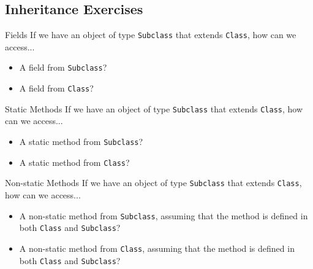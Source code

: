 \documentclass[9pt]{beamer}
\begin{document}
\subsection{Inheritance Exercises}
\begin{frame}{Fields}
  If we have an object of type {\tt Subclass} that extends {\tt Class}, how can
  we access...
  \begin{itemize}
    \item
      A field from {\tt Subclass}? \\
    \item
      A field from {\tt Class}? \\
\end{itemize}
\end{frame}

\begin{frame}{Static Methods}
  If we have an object of type {\tt Subclass} that extends {\tt Class}, how can
  we access...
  \begin{itemize}
   \item
      A static method from {\tt Subclass}? \\
   \item
      A static method from {\tt Class}? \\
 \end{itemize}
\end{frame}


\begin{frame}{Non-static Methods}
  If we have an object of type {\tt Subclass} that extends {\tt Class}, how can
  we access...
  \begin{itemize}
    \item
      A non-static method from {\tt Subclass}, assuming that the method is
      defined in both {\tt Class} and {\tt Subclass}? \\
    \item
      A non-static method from {\tt Class}, assuming that the method is defined
      in both {\tt Class} and {\tt Subclass}? \\
  \end{itemize}
\end{frame}
\end{document}
